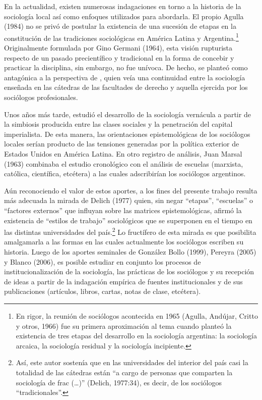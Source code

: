 En la actualidad, existen numerosas indagaciones en torno a la historia de la sociología local así como enfoques utilizados para abordarla. El propio Agulla (1984) no se privó de postular la existencia de una sucesión de etapas en la constitución de las tradiciones sociológicas en América Latina y Argentina.\footnote{En rigor, la reunión de sociólogos acontecida en 1965 (Agulla, Andújar, Critto y otros, 1966) fue su primera aproximación al tema cuando planteó la existencia de tres etapas del desarrollo en la sociología argentina: la sociología arcaica, la sociología residual y la sociología incipiente.} Originalmente formulada por Gino Germani (1964), esta visión rupturista respecto de un pasado precientífico y tradicional en la forma de concebir y practicar la disciplina, sin embargo, no fue unívoca. De hecho, se planteó como antagónica a la perspectiva de \textcite{1534-POVINA1959}, quien veía una continuidad entre la sociología enseñada en las cátedras de las facultades de derecho y aquella ejercida por los sociólogos profesionales.

Unos años más tarde, \textcite{1450-VERON1974} estudió el desarrollo de la sociología vernácula a partir de la simbiosis producida entre las clases sociales y la penetración del capital imperialista. De esta manera, las orientaciones epistemológicas de los sociólogos locales serían producto de las tensiones generadas por la política exterior de Estados Unidos en América Latina. En otro registro de análisis, Juan Marsal (1963) combinaba el estudio cronológico con el análisis de escuelas (marxista, católica, científica, etcétera) a las cuales adscribirían los sociólogos argentinos.

Aún reconociendo el valor de estos aportes, a los fines del presente trabajo resulta más adecuada la mirada de Delich (1977) quien, sin negar \enquote{etapas}, \enquote{escuelas} o \enquote{factores externos} que influyan sobre las matrices epistemológicas, afirmó la existencia de \enquote{estilos de trabajo} sociológicos que se superponen en el tiempo en las distintas universidades del país.\footnote{Así, este autor sostenía que en las universidades del interior del país casi la totalidad de las cátedras están \enquote{a cargo de personas que comparten la sociología de frac (\dots)} (Delich, 1977:34), es decir, de los sociólogos \enquote{tradicionales}.} Lo fructífero de esta mirada es que posibilita amalgamarla a las formas en las cuales actualmente los sociólogos escriben su historia. Luego de los aportes seminales de González Bollo (1999), Pereyra (2005) y Blanco (2006), es posible estudiar en conjunto los procesos de institucionalización de la sociología, las prácticas de los sociólogos y su recepción de ideas a partir de la indagación empírica de fuentes institucionales y de sus publicaciones (artículos, libros, cartas, notas de clase, etcétera).

